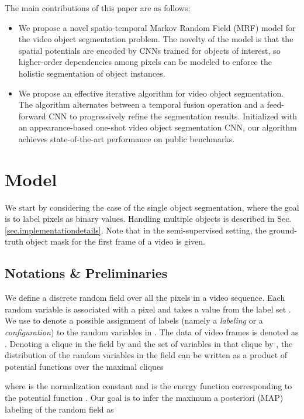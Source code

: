 \documentclass[10pt,twocolumn,letterpaper]{article}
\begin{document}
The main contributions of this paper are as follows:

\begin{itemize}
  \item We propose a novel spatio-temporal Markov Random Field (MRF) model for the video object segmentation problem.
  The novelty of the model is that the spatial potentials are encoded by CNNs trained for objects of interest,
  so higher-order dependencies among pixels can be modeled to enforce the holistic segmentation of object instances.

  \item We propose an effective iterative algorithm for video object segmentation.
  The algorithm alternates between a temporal fusion operation and a feed-forward CNN to progressively refine the segmentation results.
  Initialized with an appearance-based one-shot video object segmentation CNN, our algorithm achieves state-of-the-art performance on public benchmarks.
\end{itemize}


\section{Model}\label{sec.ourmodel}

We start by considering the case of the single object segmentation, where the goal is to label pixels as binary values.
Handling multiple objects is described in Sec. \ref{sec.implementationdetails}.
Note that in the semi-supervised setting, the ground-truth object mask for the first frame of a video is given.

\subsection{Notations \& Preliminaries}

We define a discrete random field  over all the pixels  in a video sequence.
Each random variable  is associated with a pixel  and takes a value  from the label set .
We use  to denote a possible assignment of labels (namely a \emph{labeling} or a \emph{configuration}) to the random variables in .
The data of video frames is denoted as .
Denoting a clique in the field by  and the set of variables in that clique by ,
the distribution of the random variables in the field can be written as a product of potential functions
over the maximal cliques \cite{bishop2006pattern}

where  is the normalization constant and  is the energy function corresponding to the potential function .
Our goal is to infer the maximum a posteriori (MAP) labeling  of the random field as
\end{document}
